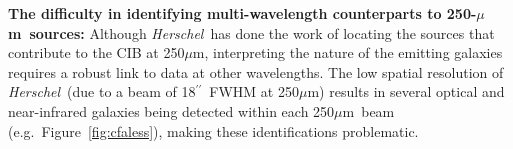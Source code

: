\documentclass[12pt,a4paper]{article}
\newcommand{\herschel}{{\it Herschel}}
\newcommand{\spitzer}{{\it Spitzer}}
\newcommand{\micron}{$\mu$m}
\newcommand{\arcsec}{$^{\prime\prime}$}
\begin{document}
%


{\bf The difficulty in identifying multi-wavelength counterparts to
  250-\micron\ sources:}
Although \herschel\ has done the work of locating
the sources that contribute to the CIB at 250\micron, interpreting the nature of the emitting galaxies requires a robust link to data at other wavelengths. The low spatial resolution of \herschel\  (due to a beam of 18\arcsec\ FWHM at
250\micron) results in several
optical and near-infrared galaxies being detected
within each 250\micron\ beam (e.g.\ Figure~\ref{fig:cfaless}), making these identifications problematic. 
\end{document}
